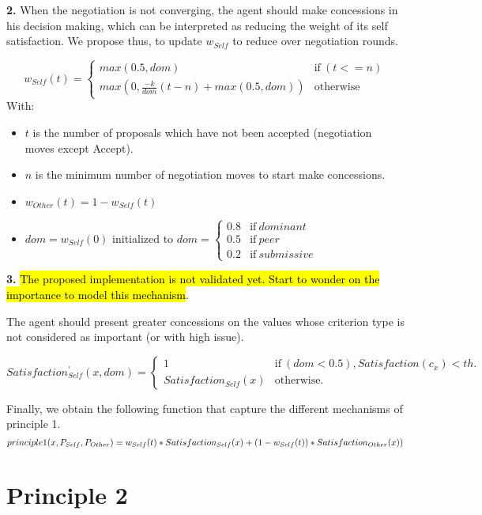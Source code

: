 \documentclass{article}
\begin{document}
\textbf{2.} When the negotiation is not converging, the agent should make concessions in his decision making, which can be interpreted as reducing the weight of its self satisfaction. We propose thus, to update $ w_{Self}$ to reduce over negotiation rounds. 


	$$w_{Self} (t) = \left\{\begin{array}{ll}
	max(0.5,dom) & \mathrm{if\ }(t<=n)\\
	max(0, \frac{-k}{dom} (t-n)+ max(0.5,dom)) & \mathrm{otherwise}
	\end{array}\right.$$ With: 
	\begin{itemize}
		\item $t$ is the number of proposals which have not been accepted (negotiation moves except Accept).
		\item $n$ is the minimum number of negotiation moves to start make concessions.
		\item $w_{Other} (t) = 1 - w_{Self} (t)$ 
		\item $dom = w_{Self} (0)$ initialized to  
				$dom = \left\{\begin{array}{ll}
				0.8 & \mathrm{if\ } dominant \\
				0.5 & \mathrm{if\ } peer \\
				0.2 & \mathrm{if\ } submissive 
				\end{array}\right.$
	 \end{itemize}



\textbf{3. } \hl{The proposed implementation is not validated yet. Start to wonder on the importance to model this mechanism}.

The agent should present greater concessions on the values whose criterion type is not considered as important (or with high issue).

$$Satisfaction^{'}_{Self} (x,dom) = \left\{\begin{array}{ll}
1 & \mathrm{if\ }(dom<0.5) , Satisfaction(c_x) < th.\\
Satisfaction_{Self}(x) & \mathrm{otherwise}.
\end{array}\right.$$

Finally, we obtain the following function that capture the different mechanisms of principle 1. 
\begin{dmath}
$$principle1(x,P_{Self},P_{Other}) = w_{Self}(t) * Satisfaction_{Self}(x) + (1 - w_{Self}(t)) * Satisfaction_{Other}(x))$$
\end{dmath}
\section{Principle 2}
\end{document}
